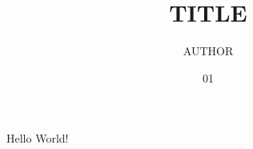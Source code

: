 \documentclass[english,course]{notes}
\title{TITLE}
\author{AUTHOR}
\date{01}{09}{2016}
\begin{document}
Hello World!
\end{document}
